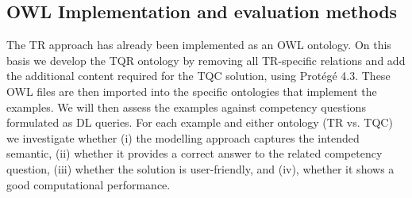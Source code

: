 \begin{itemize}
\subsection*{OWL Implementation and evaluation methods}
The TR approach has already been implemented as an OWL ontology. On this basis we develop the TQR ontology by removing all TR-specific relations and add 
the additional content required for the TQC solution, using Prot\'eg\'e 4.3. These OWL files are then imported into the specific ontologies that 
implement the examples. We will then assess the examples against competency questions formulated as DL queries. For each example and 
either ontology (TR vs. TQC) we investigate whether (i) the modelling approach captures the intended semantic, (ii) whether it provides a correct 
answer to the related competency question, (iii) whether the solution is user-friendly, and (iv), whether it shows a good computational performance.   
  
\end{itemize}